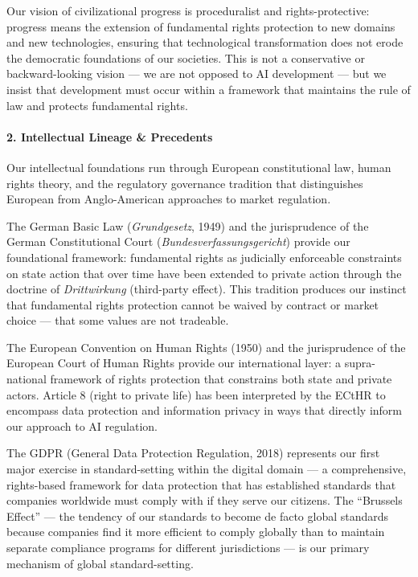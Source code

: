 Our vision of civilizational progress is proceduralist and
rights-protective: progress means the extension of fundamental rights
protection to new domains and new technologies, ensuring that
technological transformation does not erode the democratic foundations
of our societies. This is not a conservative or backward-looking vision
--- we are not opposed to AI development --- but we insist that
development must occur within a framework that maintains the rule of law
and protects fundamental rights.

\paragraph{2. Intellectual Lineage \&
Precedents}\label{intellectual-lineage-precedents-9}

Our intellectual foundations run through European constitutional law,
human rights theory, and the regulatory governance tradition that
distinguishes European from Anglo-American approaches to market
regulation.

The German Basic Law (\emph{Grundgesetz}, 1949) and the jurisprudence of
the German Constitutional Court (\emph{Bundesverfassungsgericht})
provide our foundational framework: fundamental rights as judicially
enforceable constraints on state action that over time have been
extended to private action through the doctrine of \emph{Drittwirkung}
(third-party effect). This tradition produces our instinct that
fundamental rights protection cannot be waived by contract or market
choice --- that some values are not tradeable.

The European Convention on Human Rights (1950) and the jurisprudence of
the European Court of Human Rights provide our international layer: a
supra-national framework of rights protection that constrains both state
and private actors. Article 8 (right to private life) has been
interpreted by the ECtHR to encompass data protection and information
privacy in ways that directly inform our approach to AI regulation.

The GDPR (General Data Protection Regulation, 2018) represents our first
major exercise in standard-setting within the digital domain --- a
comprehensive, rights-based framework for data protection that has
established standards that companies worldwide must comply with if they
serve our citizens. The ``Brussels Effect'' --- the tendency of our
standards to become de facto global standards because companies find it
more efficient to comply globally than to maintain separate compliance
programs for different jurisdictions --- is our primary mechanism of
global standard-setting.

